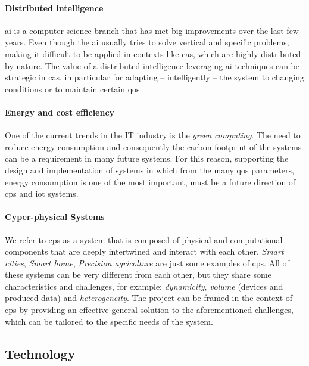 \documentclass[12pt]{article}
\begin{document}
\paragraph{Distributed intelligence}
\ac{ai} is a computer science branch that has met big improvements over the last few years.
%
Even though the \ac{ai} usually tries to solve vertical and specific problems,
making it difficult to be applied in contexts like \ac{cas},
which are highly distributed by nature.
%
The value of a distributed intelligence leveraging \ac{ai} techniques can be strategic in \ac{cas},
in particular for adapting -- intelligently -- the system to changing conditions or to maintain certain \ac{qos}.

\paragraph{Energy and cost efficiency}
One of the current trends in the IT industry is the \emph{green computing}.
%
The need to reduce energy consumption and consequently the carbon footprint of the systems can be a requirement in many future systems.
%
For this reason,
supporting the design and implementation of systems in which from the many \ac{qos} parameters,
energy consumption is one of the most important,
must be a future direction of \ac{cps} and \ac{iot} systems.

\paragraph{Cyper-physical Systems}
We refer to \ac{cps} as a system that is composed of physical and computational components
that are deeply intertwined and interact with each other.
%
\emph{Smart cities}, \emph{Smart home}, \emph{Precision agricolture} are just some examples of \ac{cps}.
%
All of these systems can be very different from each other,
but they share some characteristics and challenges,
for example: \emph{dynamicity}, \emph{volume} (devices and produced data) and \emph{heterogeneity}.
%
The project can be framed in the context of \ac{cps} by providing an effective general solution to the aforementioned challenges,
which can be tailored to the specific needs of the system.

\subsection{Technology}\label{subsec:technology}
\end{document}
